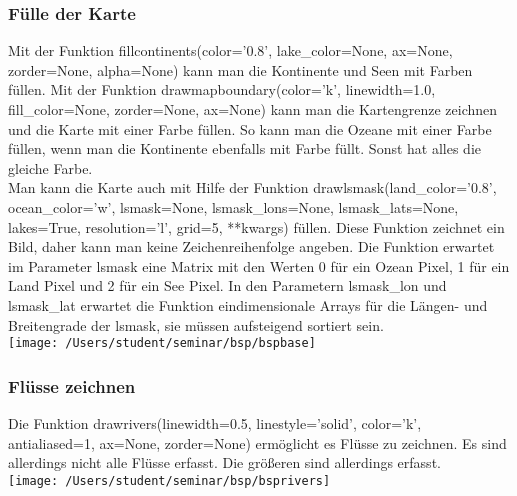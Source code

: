  \subsubsection*{Fülle der Karte}
 Mit der Funktion \textsf{fillcontinents(color='0.8', lake\_color=None, ax=None, zorder=None, alpha=None)} kann man die Kontinente und Seen mit Farben füllen.
 Mit der Funktion \textsf{drawmapboundary(color='k', linewidth=1.0, fill\_color=None, zorder=None, ax=None)} kann man die Kartengrenze zeichnen und die Karte mit einer Farbe füllen. So kann man die Ozeane mit einer Farbe füllen, wenn man die Kontinente ebenfalls mit Farbe füllt. Sonst hat alles die gleiche Farbe.\\
 Man kann die Karte auch mit Hilfe der Funktion \textsf{drawlsmask(land\_color='0.8', ocean\_color='w', lsmask=None, lsmask\_lons=None, lsmask\_lats=None, lakes=True, resolution='l', grid=5, **kwargs)} füllen.
 Diese Funktion zeichnet ein Bild, daher kann man keine Zeichenreihenfolge angeben. Die Funktion erwartet im Parameter \textsf{lsmask} eine Matrix mit den Werten 0 für ein Ozean Pixel, 1 für ein Land Pixel und 2 für ein See Pixel. In den Parametern \textsf{lsmask\_lon} und \textsf{lsmask\_lat} erwartet die Funktion eindimensionale Arrays für die Längen- und Breitengrade der \textsf{lsmask}, sie müssen aufsteigend sortiert sein.\\
 
 \texttt{[image: /Users/student/seminar/bsp/bspbase]}\newpage 
 \subsubsection*{Flüsse zeichnen}
 Die Funktion \textsf{drawrivers(linewidth=0.5, linestyle='solid', color='k', antialiased=1, ax=None, zorder=None)} ermöglicht es Flüsse zu zeichnen. Es sind allerdings nicht alle Flüsse erfasst. Die größeren sind allerdings erfasst.\\
 
 \texttt{[image: /Users/student/seminar/bsp/bsprivers]}\newpage 
